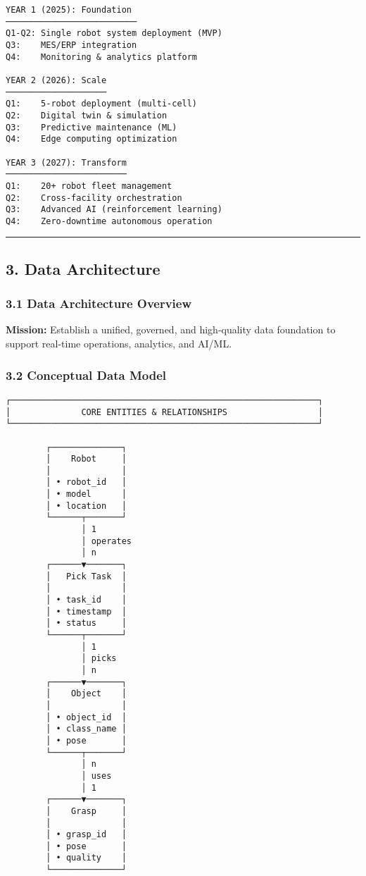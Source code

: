 \documentclass[
]{article}
\begin{document}
\begin{verbatim}
YEAR 1 (2025): Foundation
──────────────────────────
Q1-Q2: Single robot system deployment (MVP)
Q3:    MES/ERP integration
Q4:    Monitoring & analytics platform

YEAR 2 (2026): Scale
────────────────────
Q1:    5-robot deployment (multi-cell)
Q2:    Digital twin & simulation
Q3:    Predictive maintenance (ML)
Q4:    Edge computing optimization

YEAR 3 (2027): Transform
────────────────────────
Q1:    20+ robot fleet management
Q2:    Cross-facility orchestration
Q3:    Advanced AI (reinforcement learning)
Q4:    Zero-downtime autonomous operation
\end{verbatim}

\begin{center}\rule{0.5\linewidth}{0.5pt}\end{center}

\hypertarget{data-architecture}{%
\subsection{3. Data Architecture}\label{data-architecture}}

\hypertarget{data-architecture-overview}{%
\subsubsection{3.1 Data Architecture
Overview}\label{data-architecture-overview}}

\textbf{Mission:} Establish a unified, governed, and high-quality data
foundation to support real-time operations, analytics, and AI/ML.

\hypertarget{conceptual-data-model}{%
\subsubsection{3.2 Conceptual Data Model}\label{conceptual-data-model}}

\begin{verbatim}
┌─────────────────────────────────────────────────────────────┐
│              CORE ENTITIES & RELATIONSHIPS                  │
└─────────────────────────────────────────────────────────────┘

        ┌──────────────┐
        │    Robot     │
        │              │
        │ • robot_id   │
        │ • model      │
        │ • location   │
        └──────┬───────┘
               │ 1
               │ operates
               │ n
        ┌──────▼───────┐
        │   Pick Task  │
        │              │
        │ • task_id    │
        │ • timestamp  │
        │ • status     │
        └──────┬───────┘
               │ 1
               │ picks
               │ n
        ┌──────▼───────┐
        │    Object    │
        │              │
        │ • object_id  │
        │ • class_name │
        │ • pose       │
        └──────┬───────┘
               │ n
               │ uses
               │ 1
        ┌──────▼───────┐
        │    Grasp     │
        │              │
        │ • grasp_id   │
        │ • pose       │
        │ • quality    │
        └──────────────┘
\end{verbatim}
\end{document}
